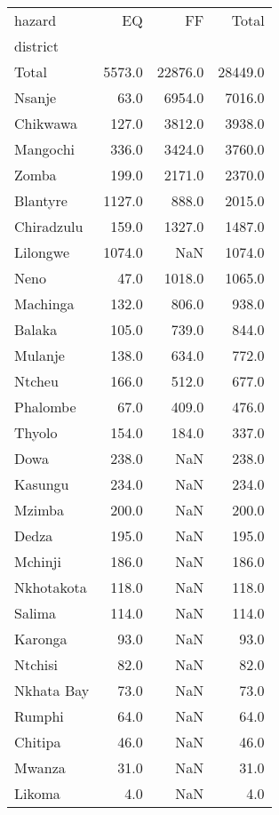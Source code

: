 \begin{tabular}{lrrr}
\toprule
hazard &      EQ &       FF &    Total \\
district   &         &          &          \\
\midrule
Total      &  5573.0 &  22876.0 &  28449.0 \\
Nsanje     &    63.0 &   6954.0 &   7016.0 \\
Chikwawa   &   127.0 &   3812.0 &   3938.0 \\
Mangochi   &   336.0 &   3424.0 &   3760.0 \\
Zomba      &   199.0 &   2171.0 &   2370.0 \\
Blantyre   &  1127.0 &    888.0 &   2015.0 \\
Chiradzulu &   159.0 &   1327.0 &   1487.0 \\
Lilongwe   &  1074.0 &      NaN &   1074.0 \\
Neno       &    47.0 &   1018.0 &   1065.0 \\
Machinga   &   132.0 &    806.0 &    938.0 \\
Balaka     &   105.0 &    739.0 &    844.0 \\
Mulanje    &   138.0 &    634.0 &    772.0 \\
Ntcheu     &   166.0 &    512.0 &    677.0 \\
Phalombe   &    67.0 &    409.0 &    476.0 \\
Thyolo     &   154.0 &    184.0 &    337.0 \\
Dowa       &   238.0 &      NaN &    238.0 \\
Kasungu    &   234.0 &      NaN &    234.0 \\
Mzimba     &   200.0 &      NaN &    200.0 \\
Dedza      &   195.0 &      NaN &    195.0 \\
Mchinji    &   186.0 &      NaN &    186.0 \\
Nkhotakota &   118.0 &      NaN &    118.0 \\
Salima     &   114.0 &      NaN &    114.0 \\
Karonga    &    93.0 &      NaN &     93.0 \\
Ntchisi    &    82.0 &      NaN &     82.0 \\
Nkhata Bay &    73.0 &      NaN &     73.0 \\
Rumphi     &    64.0 &      NaN &     64.0 \\
Chitipa    &    46.0 &      NaN &     46.0 \\
Mwanza     &    31.0 &      NaN &     31.0 \\
Likoma     &     4.0 &      NaN &      4.0 \\
\bottomrule
\end{tabular}
